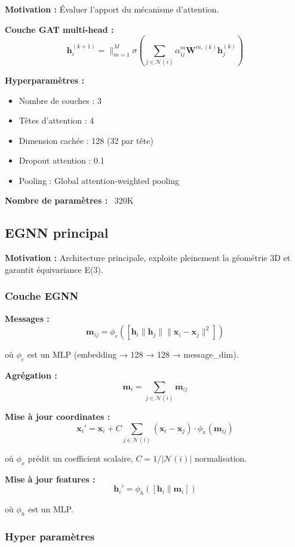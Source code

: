 \textbf{Motivation :}
Évaluer l'apport du mécanisme d'attention.

\textbf{Couche GAT multi-head :}
\[
\mathbf{h}_i^{(k+1)} = \|_{m=1}^M \sigma\left(\sum_{j \in \mathcal{N}(i)} \alpha_{ij}^m \mathbf{W}^{m,(k)}\mathbf{h}_j^{(k)}\right)
\]

\textbf{Hyperparamètres :}
\begin{itemize}
    \item Nombre de couches : 3
    \item Têtes d'attention : 4
    \item Dimension cachée : 128 (32 par tête)
    \item Dropout attention : 0.1
    \item Pooling : Global attention-weighted pooling
\end{itemize}

\textbf{Nombre de paramètres :} ~320K

\subsection{EGNN principal}

\textbf{Motivation :}
Architecture principale, exploite pleinement la géométrie 3D et garantit équivariance E(3).

\subsubsection{Couche EGNN}

\textbf{Messages :}
\[
\mathbf{m}_{ij} = \phi_e\left([\mathbf{h}_i \| \mathbf{h}_j \| \|\mathbf{x}_i - \mathbf{x}_j\|^2]\right)
\]

où $\phi_e$ est un MLP (embedding → 128 → 128 → message\_dim).

\textbf{Agrégation :}
\[
\mathbf{m}_i = \sum_{j \in \mathcal{N}(i)} \mathbf{m}_{ij}
\]

\textbf{Mise à jour coordinates :}
\[
\mathbf{x}_i' = \mathbf{x}_i + C \sum_{j \in \mathcal{N}(i)} (\mathbf{x}_i - \mathbf{x}_j) \cdot \phi_x(\mathbf{m}_{ij})
\]

où $\phi_x$ prédit un coefficient scalaire, $C = 1/|\mathcal{N}(i)|$ normalisation.

\textbf{Mise à jour features :}
\[
\mathbf{h}_i' = \phi_h([\mathbf{h}_i \| \mathbf{m}_i])
\]

où $\phi_h$ est un MLP.

\subsubsection{Hyper paramètres}

